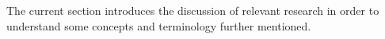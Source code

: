 \label{chapter:background}

The current section introduces the discussion of relevant research in order to understand some concepts and terminology further mentioned.




